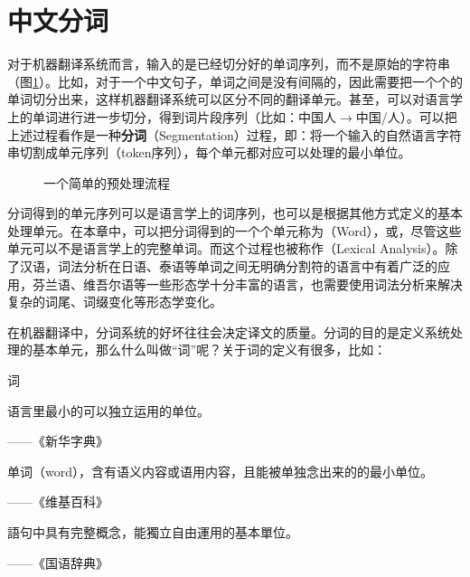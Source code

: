 \sectionnewpage
\section{中文分词}

\parinterval 对于机器翻译系统而言，输入的是已经切分好的单词序列，而不是原始的字符串（图\ref{fig:2-7}）。比如，对于一个中文句子，单词之间是没有间隔的，因此需要把一个个的单词切分出来，这样机器翻译系统可以区分不同的翻译单元。甚至，可以对语言学上的单词进行进一步切分，得到词片段序列（比如：中国人$\to$中国/人）。可以把上述过程看作是一种{\small\sffamily\bfseries{分词}}（Segmentation）过程，即：将一个输入的自然语言字符串切割成单元序列（token序列），每个单元都对应可以处理的最小单位。

\begin{figure}[htp]
\centering

\caption{一个简单的预处理流程}
\label{fig:2-7}
\end{figure}

\parinterval 分词得到的单元序列可以是语言学上的词序列，也可以是根据其他方式定义的基本处理单元。在本章中，可以把分词得到的一个个单元称为{\small{}}（Word），或{\small{}}，尽管这些单元可以不是语言学上的完整单词。而这个过程也被称作{\small{}}（Lexical Analysis）。除了汉语，词法分析在日语、泰语等单词之间无明确分割符的语言中有着广泛的应用，芬兰语、维吾尔语等一些形态学十分丰富的语言，也需要使用词法分析来解决复杂的词尾、词缀变化等形态学变化。

\parinterval 在机器翻译中，分词系统的好坏往往会决定译文的质量。分词的目的是定义系统处理的基本单元，那么什么叫做``词''呢？关于词的定义有很多，比如：

\vspace{0.5em}
\begin{definition} 词

\vspace{0.5em}
语言里最小的可以独立运用的单位。
\begin{flushright}——《新华字典》\end{flushright}

单词（word），含有语义内容或语用内容，且能被单独念出来的的最小单位。
\begin{flushright}——《维基百科》\end{flushright}

語句中具有完整概念，能獨立自由運用的基本單位。
\begin{flushright}——《国语辞典》\end{flushright}
\end{definition}


